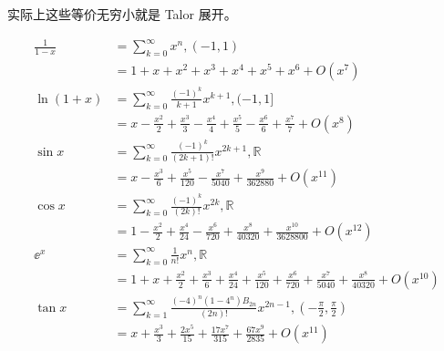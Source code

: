 实际上这些等价无穷小就是 Talor 展开。

\[
	\begin{aligned}
		\frac{1}{1-x} & = \sum_{k=0}^\infty x^n,(-1,1)                                                                                                                  \\
		              & = 1 + x + x^2 + x^3 + x^4 + x^5 + x^6 + O(x^7)                                                                                                  \\
		\ln(1+x)      & = \sum_{k=0}^\infty\frac{(-1)^k}{k+1}x^{k+1},(-1,1]                                                                                             \\
		              & = x - \frac{x^2}{2} + \frac{x^3}{3} - \frac{x^4}{4} + \frac{x^5}{5} - \frac{x^6}{6} + \frac{x^7}{7} + O(x^8)                                    \\
		\sin x        & = \sum_{k=0}^\infty \frac{(-1)^k}{(2k+1)!}x^{2k+1},\mathbb{R}                                                                                   \\
		              & = x - \frac{x^3}{6} + \frac{x^5}{120} - \frac{x^7}{5040} + \frac{x^9}{362880}+ O(x^{11})                                                        \\
		\cos x        & = \sum_{k=0}^\infty \frac{(-1)^k}{(2k)!}x^{2k},\mathbb{R}                                                                                       \\
		              & = 1 - \frac{x^2}{2} + \frac{x^4}{24} - \frac{x^6}{720} + \frac{x^8}{40320} + \frac{x^{10}}{3628800} + O(x^{12})                                 \\
		\ee^x         & = \sum_{k=0}^\infty\frac{1}{n!}x^n,\mathbb{R}                                                                                                   \\
		              & = 1 + x + \frac{x^2}{2} + \frac{x^3}{6} + \frac{x^4}{24} + \frac{x^5}{120} + \frac{x^6}{720} + \frac{x^7}{5040} + \frac{x^8}{40320} + O(x^{10}) \\
		\tan x        & = \sum_{k=1}^\infty \frac{(-4)^n(1-4^n)B_{2n}}{(2n)!}x^{2n-1},(-\frac{\pi}{2},\frac{\pi}{2})                                                    \\
		              & = x + \frac{x^3}{3} + \frac{2x^5}{15} + \frac{17x^{7}}{315} + \frac{67x^9}{2835} + O(x^{11})
	\end{aligned}
\]


